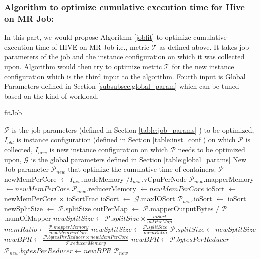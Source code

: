 \noindent\subsubsection*{\bf Algorithm to optimize cumulative execution time for Hive on MR Job:}
In this part, we would propose Algorithm \ref{jobfit} to optimize cumulative execution time of HIVE on MR Job  i.e., metric $\mathcal{T}$ as defined above. It takes job parameters of the job and the instance configuration on which it was collected upon. Algorithm would then try to optimize metric $\mathcal{T}$ for the new instance configuration which is the third input to the algorithm. Fourth input is Global Parameters defined in Section \ref{subsubsec:global_param} which can be tuned based on the kind of workload.

\renewcommand{\algorithmicrequire}{\textbf{Input:}}
\renewcommand{\algorithmicensure}{\textbf{Output:}}
\renewcommand{\algorithmiccomment}[1]{// #1}
\begin{algorithm}
\caption{fitJob}\label{jobfit}
\begin{algorithmic}[1]
\footnotesize
\REQUIRE  $\mathcal{P}$ is the job parameters (defined in Section \ref{table:job_params} ) to be optimized, $I_{old}$  is instance configuration (defined in Section \ref{table:inst_conf}) on which $\mathcal{P}$ is collected, $I_{new}$ is new instance configuration on which $\mathcal{P}$ needs to be optimized upon, $\mathcal{G}$ is the global parameters defined in Section \ref{table:global_params}
\ENSURE New Job parameter $\mathcal{P}_{new}$ that optimize the cumulative time of containers.
 \RETURN $\mathcal{P}$ 
\ENDIF
\STATE newMemPerCore $\gets I_{new}$.nodeMemory $/ I_{new}$.vCpuPerNode
\STATE $\mathcal{P}_{new}$.mapperMemory $\gets newMemPerCore$
\STATE $\mathcal{P}_{new}$.reducerMemory $\gets newMemPerCore$
\STATE ioSort $\gets$ newMemPerCore $\times$ ioSortFrac
\STATE ioSort $\gets$ $\mathcal{G}$.maxIOSort
\ENDIF
\STATE $\mathcal{P}_{new}$.ioSort $\gets$ ioSort
\STATE newSplitSize $\gets$ $\mathcal{P}$.splitSize
\STATE outPerMap $\gets$ $\mathcal{P}$.mapperOutputBytes $/$ $\mathcal{P}$.numOfMapper
\STATE $newSplitSize \gets \mathcal{P}.splitSize \times \frac{ioSort}{outPerMap}$
\STATE $memRatio \gets \frac{\mathcal{P}.mapperMemory}{newMemPerCore}$
\STATE $newSplitSize \gets \frac{\mathcal{P}.splitSize}{memRatio} $
\ENDIF
\STATE $\mathcal{P}.splitSize \gets newSplitSize$
\STATE $newBPR \gets \frac{\mathcal{P}.bytesPerReducer \times newMemPerCore}{\mathcal{P}.reducerMemory}$
\ELSE
\STATE $newBPR \gets \mathcal{P}.bytesPerReducer$
\ENDIF
\STATE $\mathcal{P}_{new}.bytesPerReducer \gets newBPR$
\STATE \RETURN $\mathcal{P}_{new}$
\end{algorithmic}
\end{algorithm}

